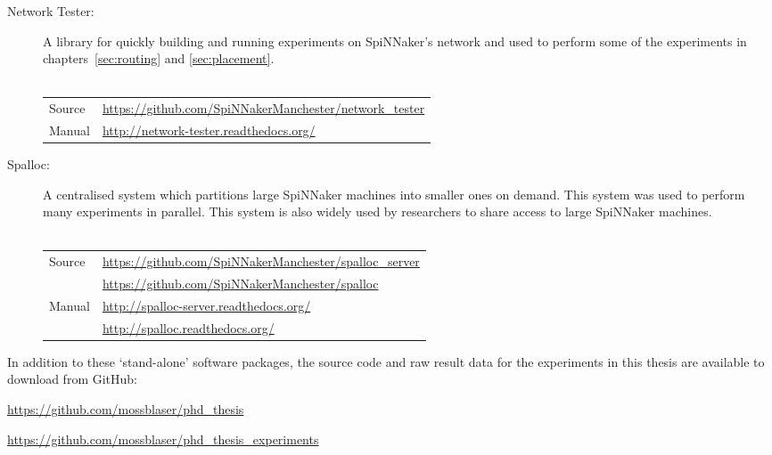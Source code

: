 \begin{description}
		\item [Network Tester:] A library for quickly building and running
		experiments on SpiNNaker's network and used to perform some of the
		experiments in chapters~\ref{sec:routing} and \ref{sec:placement}.
		\\
		\vspace*{-1.25em}
		\\
		\begin{tabular}{ll}
			Source & \url{https://github.com/SpiNNakerManchester/network_tester} \\
			Manual & \url{http://network-tester.readthedocs.org/} \\
		\end{tabular}
		
		\item [Spalloc:] A centralised system which partitions large SpiNNaker
		machines into smaller ones on demand. This system was used to perform many
		experiments in parallel. This system is also widely used by researchers to
		share access to large SpiNNaker machines.
		\\
		\vspace*{-1.25em}
		\\
		\begin{tabular}{ll}
			Source & \url{https://github.com/SpiNNakerManchester/spalloc_server} \\
			       & \url{https://github.com/SpiNNakerManchester/spalloc} \\
			Manual & \url{http://spalloc-server.readthedocs.org/} \\
			       & \url{http://spalloc.readthedocs.org/} \\
		\end{tabular}
		
	\end{description}

In addition to these `stand-alone' software packages, the source code and raw
result data for the experiments in this thesis are available to download from
GitHub:

\url{https://github.com/mossblaser/phd_thesis}

\url{https://github.com/mossblaser/phd_thesis_experiments}
